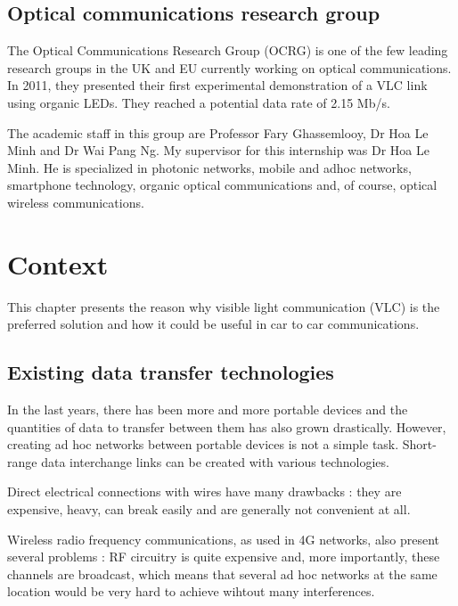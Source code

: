 \documentclass[12pt]{report}
\begin{document}
\section{Optical communications research group}

The Optical Communications Research Group (OCRG) is one of the few leading research groups in the UK and EU currently working on optical communications.
In 2011, they presented their first experimental demonstration of a VLC link using organic LEDs. They reached a potential data rate of 2.15 Mb/s.

The academic staff in this group are Professor Fary Ghassemlooy, Dr Hoa Le Minh and Dr Wai Pang Ng.
My supervisor for this internship was Dr Hoa Le Minh. He is specialized in photonic networks, mobile and adhoc networks, smartphone technology, organic optical communications and, of course, optical wireless communications.












\chapter{Context}

This chapter presents the reason why visible light communication (VLC) is the preferred solution and how it could be useful in car to car communications.

\section{Existing data transfer technologies}

In the last years, there has been more and more portable devices and the quantities of data to transfer between them has also grown drastically. However, creating ad hoc networks between portable devices is not a simple task. Short-range data interchange links can be created with various technologies.

Direct electrical connections with wires have many drawbacks : they are expensive, heavy, can break easily and are generally not convenient at all.

Wireless radio frequency communications, as used in 4G networks, also present several problems : RF circuitry is quite expensive and, more importantly, these channels are broadcast, which means that several ad hoc networks at the same location would be very hard to achieve wihtout many interferences.
\end{document}
